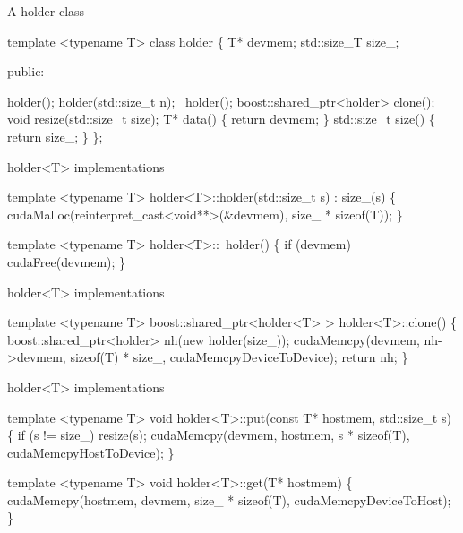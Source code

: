 \documentclass[10pt]{beamer}
\begin{document}

\begin{frame}[fragile]{A holder class}
  \begin{semiverbatim}template <typename T>
class holder
\{
    T* devmem;
    std::size_T size_;

  public:

    holder();
    holder(std::size_t n);
    ~holder();
    boost::shared_ptr<holder> clone();
    void resize(std::size_t size);
    T* data() \{ return devmem; \}
    std::size_t size() \{ return size_; \}
\};
\end{semiverbatim}
\end{frame}

\begin{frame}[fragile]{holder<T> implementations}
\begin{semiverbatim}template <typename T>
holder<T>::holder(std::size_t s) : size_(s)
\{
   cudaMalloc(reinterpret_cast<void**>(&devmem), 
              size_ * sizeof(T));
\}

template <typename T>
holder<T>::~holder()
\{
  if (devmem)
    cudaFree(devmem);
\}
  \end{semiverbatim}
\end{frame}

\begin{frame}[fragile]{holder<T> implementations}
\begin{semiverbatim}template <typename T>
boost::shared_ptr<holder<T> >
holder<T>::clone()
\{
   boost::shared_ptr<holder> nh(new holder(size_));
   cudaMemcpy(devmem, nh->devmem,
              sizeof(T) * size_,
              cudaMemcpyDeviceToDevice);       
   return nh;
\}
  \end{semiverbatim}
\end{frame}


\begin{frame}[fragile]{holder<T> implementations}
\begin{semiverbatim}template <typename T>
void
holder<T>::put(const T* hostmem, std::size_t s)
\{
  if (s != size_)
    resize(s);
  cudaMemcpy(devmem, hostmem, s * sizeof(T),
             cudaMemcpyHostToDevice);
\}

template <typename T>
void
holder<T>::get(T* hostmem)
\{
  cudaMemcpy(hostmem, devmem, size_ * sizeof(T),
             cudaMemcpyDeviceToHost);
\}\end{semiverbatim}


\end{frame}
\end{document}
